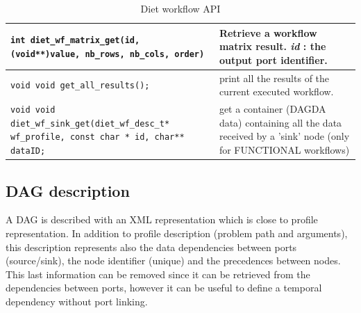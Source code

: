 \begin{table}[htbp]
\begin{tabular}[htbp]{|p{8cm}|p{7.5cm}|}
    \\\hline
    \texttt{int \newline
      diet\_wf\_matrix\_get(id, (void**)value, nb\_rows, nb\_cols, order)
    }
    &
    Retrieve a workflow matrix result. \newline
    \textit{id} : the output port identifier.
    \\\hline
    \texttt{void \newline
      void get\_all\_results();}
    &
    print all the results of the current executed workflow.
    \\\hline
    \texttt{void \newline
      void diet\_wf\_sink\_get(diet\_wf\_desc\_t* wf\_profile, const char * id, char** dataID;}
    &
    get a container (DAGDA data) containing all the data received by a 'sink' node (only for
    FUNCTIONAL workflows)
    \\\hline
  \end{tabular}
  \caption{Diet workflow API}
  \label{tab::wf_api}
\end{table}


\subsection{DAG description}
\label{sec:workflow_desc}

A DAG is described with an XML representation which is close
to \diet profile representation. In addition to profile description
(problem path and arguments), this description represents also the
data dependencies between ports (source/sink), the node identifier
(unique) and the precedences between nodes. This last information can
be removed since it can be retrieved from the dependencies between
ports, however it can be useful to define a temporal dependency
without port linking.

